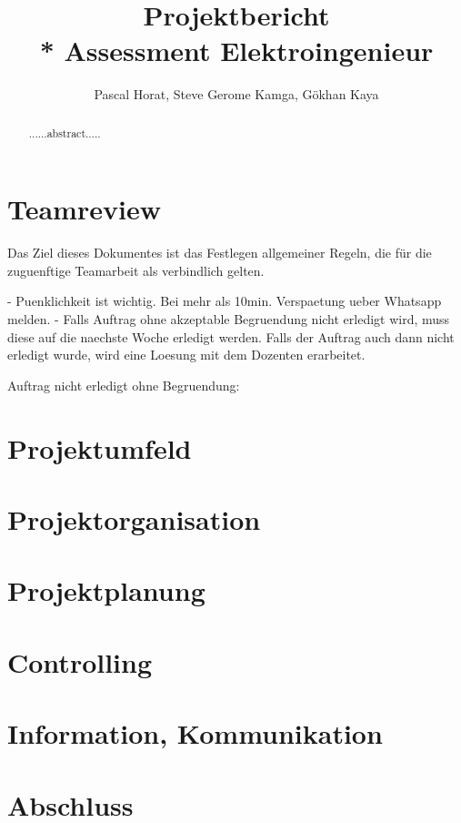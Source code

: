 \documentclass[10pt]{article}
\title{Projektbericht\\* Assessment Elektroingenieur}
\author{Pascal Horat, Steve Gerome Kamga, Gökhan Kaya}
\begin{document}
\maketitle

\begin{abstract}
......abstract.....
\end{abstract}

\tableofcontents

\section{Teamreview}

Das Ziel dieses Dokumentes ist das Festlegen allgemeiner Regeln, die für die zuguenftige Teamarbeit als verbindlich gelten.

- Puenklichkeit ist wichtig. Bei mehr als 10min. Verspaetung ueber Whatsapp melden. 
- Falls Auftrag ohne akzeptable Begruendung nicht erledigt wird, muss diese auf die naechste Woche erledigt werden. Falls der Auftrag auch dann nicht erledigt wurde, wird eine Loesung mit dem Dozenten erarbeitet.

Auftrag nicht erledigt ohne Begruendung:

\section{Projektumfeld}

\section{Projektorganisation}

\section{Projektplanung}

\section{Controlling}

\section{Information, Kommunikation}

\section{Abschluss}
\end{document}
